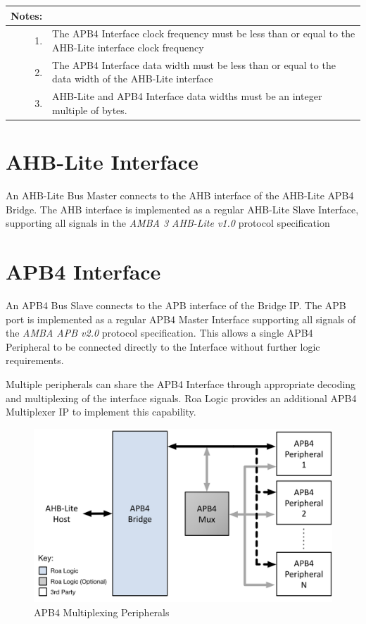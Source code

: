 \begin{longtable}[]{@{}|rp{12cm}@{}}
		\textbf{Notes:} & \tabularnewline
		\endhead
	  1. & The APB4 Interface clock frequency must be less than or equal to the AHB-Lite interface clock frequency\\
		2. & The APB4 Interface data width must be less than or equal to the data width of the AHB-Lite interface\\
		3. & AHB-Lite and APB4 Interface data widths must be an integer multiple of bytes.\\
\end{longtable}

	
\section{AHB-Lite Interface}\label{ahb-lite-interface}

An AHB-Lite Bus Master connects to the AHB interface of the AHB-Lite
APB4 Bridge. The AHB interface is implemented as a regular AHB-Lite
Slave Interface, supporting all signals in the \emph{AMBA 3 AHB-Lite
v1.0} protocol specification

\section{APB4 Interface}\label{apb4-interface}

An APB4 Bus Slave connects to the APB interface of the Bridge IP. The
APB port is implemented as a regular APB4 Master Interface supporting
all signals of the \emph{AMBA APB v2.0} protocol specification. This
allows a single APB4 Peripheral to be connected directly to the
Interface without further logic requirements.

Multiple peripherals can share the APB4 Interface through appropriate
decoding and multiplexing of the interface signals. Roa Logic provides
an additional APB4 Multiplexer IP to implement this capability.

\begin{figure}[tbh]
	\centering
	\includegraphics{assets/img/apb4-bridge-sys.png}
	\caption{APB4 Multiplexing Peripherals}
	\label{fig:apb4-bridge-sys}
\end{figure}